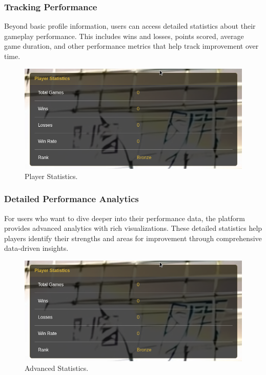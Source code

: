 \subsubsection{Tracking Performance} Beyond basic profile information, users can access detailed statistics about their gameplay performance. This includes wins and losses, points scored, average game duration, and other performance metrics that help track improvement over time.

\begin{figure}[H]
    \centering
    \includegraphics[width=0.65\linewidth]{Figures/images/new_images/PlayerStatistics.png}
    \caption{Player Statistics.} %
    \label{fig:player-stats-journey}
\end{figure}

\subsubsection{Detailed Performance Analytics} For users who want to dive deeper into their performance data, the platform provides advanced analytics with rich visualizations. These detailed statistics help players identify their strengths and areas for improvement through comprehensive data-driven insights.

\begin{figure}[H]
    \centering
    \includegraphics[width=0.65\linewidth]{Figures/images/new_images/PlayerStatistics.png}
    \caption{Advanced Statistics.} %
    \label{fig:advanced-statistics-journey}
\end{figure}

